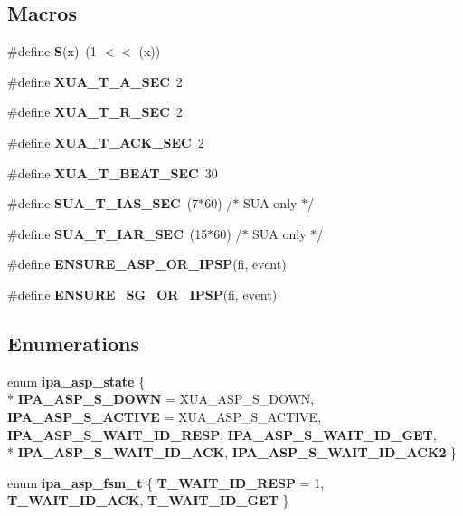 \subsection*{Macros}
\begin{DoxyCompactItemize}
\item 
\#define {\bf S}(x)~(1 $<$$<$ (x))
\item 
\#define {\bf X\+U\+A\+\_\+\+T\+\_\+\+A\+\_\+\+S\+EC}~2
\item 
\#define {\bf X\+U\+A\+\_\+\+T\+\_\+\+R\+\_\+\+S\+EC}~2
\item 
\#define {\bf X\+U\+A\+\_\+\+T\+\_\+\+A\+C\+K\+\_\+\+S\+EC}~2
\item 
\#define {\bf X\+U\+A\+\_\+\+T\+\_\+\+B\+E\+A\+T\+\_\+\+S\+EC}~30
\item 
\#define {\bf S\+U\+A\+\_\+\+T\+\_\+\+I\+A\+S\+\_\+\+S\+EC}~(7$\ast$60)		/$\ast$ S\+UA only $\ast$/
\item 
\#define {\bf S\+U\+A\+\_\+\+T\+\_\+\+I\+A\+R\+\_\+\+S\+EC}~(15$\ast$60)		/$\ast$ S\+UA only $\ast$/
\item 
\#define {\bf E\+N\+S\+U\+R\+E\+\_\+\+A\+S\+P\+\_\+\+O\+R\+\_\+\+I\+P\+SP}(fi,  event)
\item 
\#define {\bf E\+N\+S\+U\+R\+E\+\_\+\+S\+G\+\_\+\+O\+R\+\_\+\+I\+P\+SP}(fi,  event)
\end{DoxyCompactItemize}
\subsection*{Enumerations}
\begin{DoxyCompactItemize}
\item 
enum {\bf ipa\+\_\+asp\+\_\+state} \{ \\*
{\bf I\+P\+A\+\_\+\+A\+S\+P\+\_\+\+S\+\_\+\+D\+O\+WN} = X\+U\+A\+\_\+\+A\+S\+P\+\_\+\+S\+\_\+\+D\+O\+WN, 
{\bf I\+P\+A\+\_\+\+A\+S\+P\+\_\+\+S\+\_\+\+A\+C\+T\+I\+VE} = X\+U\+A\+\_\+\+A\+S\+P\+\_\+\+S\+\_\+\+A\+C\+T\+I\+VE, 
{\bf I\+P\+A\+\_\+\+A\+S\+P\+\_\+\+S\+\_\+\+W\+A\+I\+T\+\_\+\+I\+D\+\_\+\+R\+E\+SP}, 
{\bf I\+P\+A\+\_\+\+A\+S\+P\+\_\+\+S\+\_\+\+W\+A\+I\+T\+\_\+\+I\+D\+\_\+\+G\+ET}, 
\\*
{\bf I\+P\+A\+\_\+\+A\+S\+P\+\_\+\+S\+\_\+\+W\+A\+I\+T\+\_\+\+I\+D\+\_\+\+A\+CK}, 
{\bf I\+P\+A\+\_\+\+A\+S\+P\+\_\+\+S\+\_\+\+W\+A\+I\+T\+\_\+\+I\+D\+\_\+\+A\+C\+K2}
 \}
\item 
enum {\bf ipa\+\_\+asp\+\_\+fsm\+\_\+t} \{ {\bf T\+\_\+\+W\+A\+I\+T\+\_\+\+I\+D\+\_\+\+R\+E\+SP} = 1, 
{\bf T\+\_\+\+W\+A\+I\+T\+\_\+\+I\+D\+\_\+\+A\+CK}, 
{\bf T\+\_\+\+W\+A\+I\+T\+\_\+\+I\+D\+\_\+\+G\+ET}
 \}
\end{DoxyCompactItemize}

